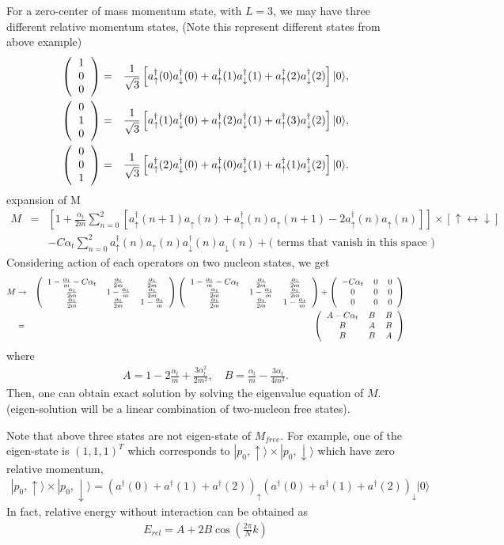 \documentclass[10pt]{book}
\newcommand{\bea}{\begin{eqnarray}}
\newcommand{\eea}{\end{eqnarray}}
\newcommand{\no}{\nonumber \\}
\def\ra{\rangle}
\newcommand{\colmthr}[3]
{\left(\begin{tabular}{c} {$#1$}\\{$#2$}\\{$#3$}\end{tabular}\right)}
\newcommand{\threedmat}[9]
{\left(\begin{tabular}{ccc} {$#1$}&{$#2$}&{$#3$} \\
		{$#4$}&{$#5$}&{$#6$}\\
		{$#7$}&{$#8$}&{$#9$}\\
	\end{tabular}\right)}
\begin{document}
For a zero-center of mass momentum state, with $L=3$, we may have three different relative momentum states,
(Note this represent different states from above example)
\bea 
\colmthr{1}{0}{0}&=&\frac{1}{\sqrt{3}}\left[ a^\dagger_\uparrow(0) a^\dagger_\downarrow(0)
                +a^\dagger_\uparrow(1) a^\dagger_\downarrow(1)
                +a^\dagger_\uparrow(2) a^\dagger_\downarrow(2)\right] |0\ra ,\no 
\colmthr{0}{1}{0}&=&\frac{1}{\sqrt{3}}\left[ a^\dagger_\uparrow(1) a^\dagger_\downarrow(0)
+a^\dagger_\uparrow(2) a^\dagger_\downarrow(1)
+a^\dagger_\uparrow(3) a^\dagger_\downarrow(2)\right] |0\ra ,\no                 
\colmthr{0}{0}{1}&=&\frac{1}{\sqrt{3}}\left[ a^\dagger_\uparrow(2) a^\dagger_\downarrow(0)
+a^\dagger_\uparrow(0) a^\dagger_\downarrow(1)
+a^\dagger_\uparrow(1) a^\dagger_\downarrow(2)\right] |0\ra. 
\eea 
expansion of M
\bea 
M&=& [1+\frac{\alpha_t}{2m}\sum_{n=0}^2 [a^\dagger_\uparrow(n+1) a_\uparrow(n)
                                       +a^\dagger_\uparrow(n) a_\uparrow(n+1)
                                       -2 a^\dagger_\uparrow(n) a_\uparrow(n) ]  ]
    \times [\uparrow\leftrightarrow \downarrow] \no & &
    - C\alpha_t \sum_{n=0}^2 a^\dagger_\uparrow(n)a_\uparrow(n)a^\dagger_\downarrow(n)a_\downarrow(n)
    +\mbox{( terms that vanish in this space )}
\eea 
Considering action of each operators on two nucleon states, we get
\bea 
M&\to&\threedmat{1-\frac{\alpha_t}{m}-C\alpha_t}{\frac{\alpha_t}{2m}}{\frac{\alpha_t}{2m}}
{\frac{\alpha_t}{2m}}{1-\frac{\alpha_t}{m}}{\frac{\alpha_t}{2m}}
{\frac{\alpha_t}{2m}}{\frac{\alpha_t}{2m}}{1-\frac{\alpha_t}{m}}
\threedmat{1-\frac{\alpha_t}{m}-C\alpha_t}{\frac{\alpha_t}{2m}}{\frac{\alpha_t}{2m}}
{\frac{\alpha_t}{2m}}{1-\frac{\alpha_t}{m}}{\frac{\alpha_t}{2m}}
{\frac{\alpha_t}{2m}}{\frac{\alpha_t}{2m}}{1-\frac{\alpha_t}{m}}
+\threedmat{-C\alpha_t}{0}{0}{0}{0}{0}{0}{0}{0} \no 
 &=&\threedmat{A-C\alpha_t}{B}{B}{B}{A}{B}{B}{B}{A}
\eea 
where
\bea 
A=1-2\frac{\alpha_t}{m}+\frac{3\alpha_t^2}{2m^2},\quad 
B=\frac{\alpha_t}{m}-\frac{3\alpha_t}{4m^2}.
\eea 
Then, one can obtain exact solution by solving the eigenvalue equation of $M$.
(eigen-solution will be a linear combination of two-nucleon free states). 

Note that above three states are not eigen-state of $M_{free}$. For example,
one of the eigen-state is $(1,1,1)^T$ which corresponds to 
$|p_0,\uparrow\ra\times|p_0,\downarrow\ra  $ which have zero relative momentum,
\bea 
|p_0,\uparrow\ra\times|p_0,\downarrow\ra
=\left(a^\dagger(0)+a^\dagger(1)+a^\dagger(2)\right)_\uparrow  
 \left(a^\dagger(0)+a^\dagger(1)+a^\dagger(2)\right)_\downarrow |0\ra 
\eea 
In fact, relative energy without interaction can be obtained as
\bea 
E_{rel}=A+2B\cos(\frac{2\pi}{N}k)
\eea 
\end{document}
